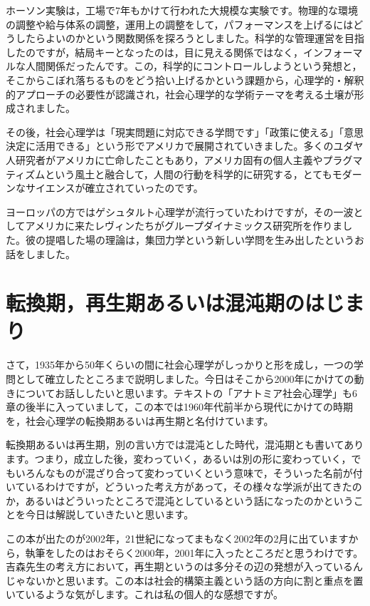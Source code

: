 \documentclass{ltjsbook}
\begin{document}
ホーソン実験は，工場で7年もかけて行われた大規模な実験です。物理的な環境の調整や給与体系の調整，運用上の調整をして，パフォーマンスを上げるにはどうしたらよいのかという関数関係を探ろうとしました。科学的な管理運営を目指したのですが，結局キーとなったのは，目に見える関係ではなく，インフォーマルな人間関係だったんです。この，科学的にコントロールしようという発想と，そこからこぼれ落ちるものをどう拾い上げるかという課題から，心理学的・解釈的アプローチの必要性が認識され，社会心理学的な学術テーマを考える土壌が形成されました。

その後，社会心理学は「現実問題に対応できる学問です」「政策に使える」「意思決定に活用できる」という形でアメリカで展開されていきました。多くのユダヤ人研究者がアメリカに亡命したこともあり，アメリカ固有の個人主義やプラグマティズムという風土と融合して，人間の行動を科学的に研究する，とてもモダーンなサイエンスが確立されていったのです。

ヨーロッパの方ではゲシュタルト心理学が流行っていたわけですが，その一波としてアメリカに来たレヴィンたちがグループダイナミックス研究所を作りました。彼の提唱した場の理論は，集団力学という新しい学問を生み出したというお話をしました。

\section{転換期，再生期あるいは混沌期のはじまり}

さて，1935年から50年くらいの間に社会心理学がしっかりと形を成し，一つの学問として確立したところまで説明しました。今日はそこから2000年にかけての動きについてお話ししたいと思います。テキスト\parencite{anatomia}の「アナトミア社会心理学」も6章の後半に入っていまして，この本では1960年代前半から現代にかけての時期を，社会心理学の転換期あるいは再生期と名付けています。

転換期あるいは再生期，別の言い方では混沌とした時代，混沌期とも書いてあります。つまり，成立した後，変わっていく，あるいは別の形に変わっていく，でもいろんなものが混ざり合って変わっていくという意味で，そういった名前が付いているわけですが，どういった考え方があって，その様々な学派が出てきたのか，あるいはどういったところで混沌としているという話になったのかということを今日は解説していきたいと思います。

この本が出たのが2002年，21世紀になってまもなく2002年の2月に出ていますから，執筆をしたのはおそらく2000年，2001年に入ったところだと思うわけです。吉森先生の考え方において，再生期というのは多分その辺の発想が入っているんじゃないかと思います。この本は社会的構築主義という話の方向に割と重点を置いているような気がします。これは私の個人的な感想ですが。
\end{document}
